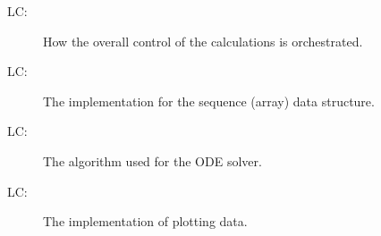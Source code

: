 \documentclass[12pt]{article}
\newcounter{lcnum}
\newcommand{\lcthelcnum}{LC\thelcnum}
\begin{document}
\begin{description}
\item[\lcthelcnum\label{LCcontrol}:]How the overall control of the calculations is orchestrated.
\end{description}
\begin{description}
\item[\lcthelcnum\label{LCsequence}:]The implementation for the sequence (array) data structure.
\end{description}
\begin{description}
\item[\lcthelcnum\label{LCode}:]The algorithm used for the ODE solver.
\end{description}
\begin{description}
\item[\lcthelcnum\label{LCplot}:]The implementation of plotting data.
\end{description}
\end{document}
